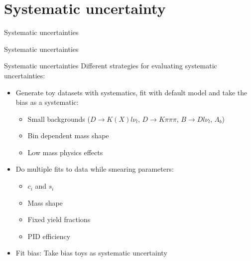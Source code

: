 \documentclass{beamer}
\begin{document}
\section{Systematic uncertainty}
\begin{frame}{Systematic uncertainties}
  \begin{center}
    {\huge Systematic uncertainties}
  \end{center}
\end{frame}

\begin{frame}{Systematic uncertainties}
  Different strategies for evaluating systematic uncertainties:
  \vspace{0.2cm}
  \begin{itemize}
    \setlength\itemsep{1em}
    \item{Generate toy datasets with systematics, fit with default model and take the bias as a systematic:}
    \begin{itemize}
      \item{Small backgrounds ($D\to K(X)l\nu_l$, $D\to K\pi\pi\pi$, $B\to Dl\nu_l$, $\Lambda_b$)}
      \item{Bin dependent mass shape}
      \item{Low mass physics effects}
    \end{itemize}
    \item{Do multiple fits to data while smearing parameters:}
    \begin{itemize}
      \item{$c_i$ and $s_i$}
      \item{Mass shape}
      \item{Fixed yield fractions}
      \item{PID efficiency}
    \end{itemize}
    \item{Fit bias: Take bias toys as systematic uncertainty}
  \end{itemize}
\end{frame}
\end{document}
